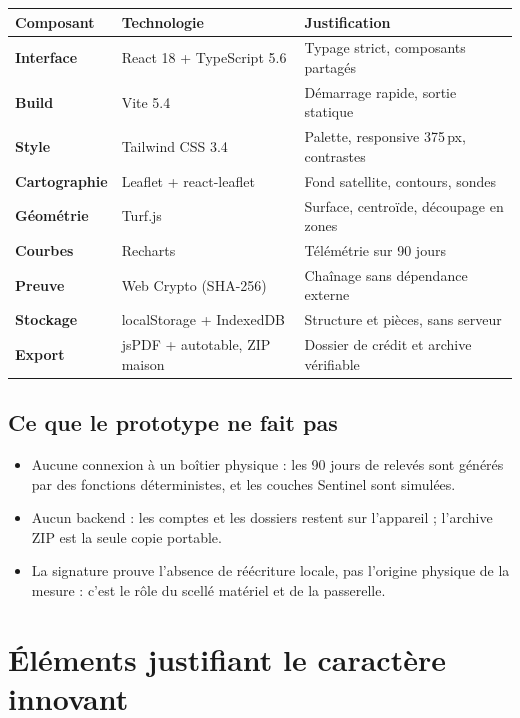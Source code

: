 \documentclass[12pt, a4paper]{article}
\begin{document}
\begin{tabularx}{\linewidth}{>{\bfseries\color{primary}}l l X}
  \toprule
  \rowcolor{lightbg}
  Composant & Technologie & Justification \\
  \midrule
  Interface & React 18 + TypeScript 5.6 & Typage strict, composants partagés \\
  \addlinespace
  Build & Vite 5.4 & Démarrage rapide, sortie statique \\
  \addlinespace
  Style & Tailwind CSS 3.4 & Palette, responsive 375\,px, contrastes \\
  \addlinespace
  Cartographie & Leaflet + react-leaflet & Fond satellite, contours, sondes \\
  \addlinespace
  Géométrie & Turf.js & Surface, centroïde, découpage en zones \\
  \addlinespace
  Courbes & Recharts & Télémétrie sur 90 jours \\
  \addlinespace
  Preuve & Web Crypto (SHA-256) & Chaînage sans dépendance externe \\
  \addlinespace
  Stockage & localStorage + IndexedDB & Structure et pièces, sans serveur \\
  \addlinespace
  Export & jsPDF + autotable, ZIP maison & Dossier de crédit et archive vérifiable \\
  \bottomrule
\end{tabularx}

\subsection{Ce que le prototype ne fait pas}

\begin{itemize}
  \item Aucune connexion à un boîtier physique : les 90 jours de relevés sont générés par
        des fonctions déterministes, et les couches Sentinel sont simulées.
  \item Aucun backend : les comptes et les dossiers restent sur l'appareil ; l'archive ZIP
        est la seule copie portable.
  \item La signature prouve l'absence de réécriture locale, pas l'origine physique de la
        mesure : c'est le rôle du scellé matériel et de la passerelle.
\end{itemize}

\section{Éléments justifiant le caractère innovant}
\end{document}
